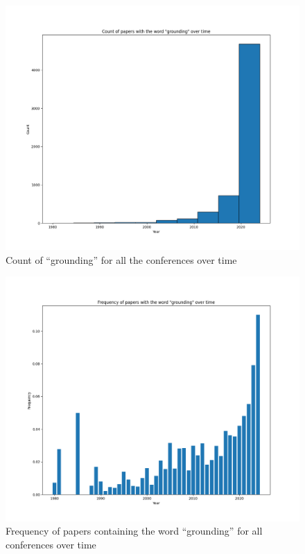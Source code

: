 \documentclass[11pt]{article}
\begin{document}
\begin{figure}[h]
  \includegraphics[width=\columnwidth]{figs/year_distribution/all_confs_grounding.png}
  \caption{Count of ``grounding'' for all the conferences over time}
  \label{fig:all_confs_count}
\end{figure}

\begin{figure}[h]
  \includegraphics[width=\columnwidth]{figs/year_distribution_freq/all_confs_grounding_dist.png}
  \caption{Frequency of papers containing the word ``grounding'' for all conferences over time}
  \label{fig:all_confs_freq}
\end{figure}
\end{document}
